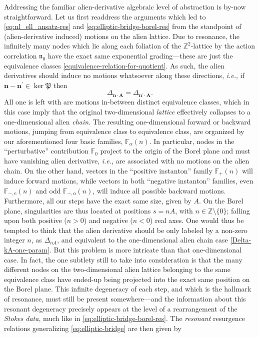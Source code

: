 \documentclass[11pt,a4paper]{article}
\def\BZ{{\mathbb Z}}
\def\BF{{\mathbb F}}
\newcommand{\nres}{\boldsymbol{\mathfrak{n}}_0}
\begin{document}
Addressing the familiar alien-derivative algebraic level of abstraction is by-now straightforward. Let us first readdress the arguments which led to \eqref{eq:nl_ell_ansatz-res} and \eqref{eq:elliptic-bridge-borel-res} from the standpoint of (alien-derivative induced) motions on the alien lattice. Due to resonance, the infinitely many nodes which lie along each foliation of the $\BZ^2$-lattice by the action correlation $\nres$ have the exact same exponential grading---these are just the equivalence classes \eqref{equivalence-relation-for-quotient}. As such, the alien derivatives should induce no motions whatsoever along these directions, \textit{i.e.}, if $\boldsymbol{n} - \boldsymbol{n}^\prime \in \ker \mathfrak{P}$ then
%
\begin{equation}
\Delta_{\boldsymbol{n} \cdot \boldsymbol{A}} = \Delta_{\boldsymbol{n}^\prime \cdot \boldsymbol{A}}.
\end{equation} 
%
\noindent
All one is left with are motions in-between distinct equivalence classes, which in this case imply that the original two-dimensional \textit{lattice} effectively collapses to a one-dimensional alien \textit{chain}. The resulting one-dimensional forward or backward motions, jumping from equivalence class to equivalence class, are organized by our aforementioned four basic families, $\BF_\alpha (n)$. In particular, nodes in the ``perturbative'' contribution $\BF_0$ project to the origin of the Borel plane and must have vanishing alien derivative, \textit{i.e.}, are associated with no motions on the alien chain. On the other hand, vectors in the ``positive instanton'' family $\BF_{+} (n)$ will induce forward motions, while vectors in both ``negative instanton'' families, even $\BF_{-,\text{e}} (n)$ and odd $\BF_{-,\text{o}} (n)$, will induce all possible backward motions. Furthermore, all our steps have the exact same size, given by $A$. On the Borel plane, singularities are thus located at positions $s = n A$, with $n \in \BZ \setminus \{ 0 \}$; falling upon both positive ($n>0$) and negative ($n<0$) real axes. One would thus be tempted to think that the alien derivative should be only labeled by a non-zero integer $n$, as $\Delta_{n A}$, and equivalent to the one-dimensional alien chain case \eqref{Delta-kA-one-param}. But this problem is more intricate than that one-dimensional case. In fact, the one subtlety still to take into consideration is that the many different nodes on the two-dimensional alien lattice belonging to the same equivalence class have ended-up being projected into the exact same position on the Borel plane. This infinite degeneracy of each step, and which is the hallmark of resonance, must still be present somewhere---and the information about this resonant degeneracy precisely appears at the level of a rearrangement of the \textit{Stokes data}, much like in \eqref{eq:elliptic-bridge-borel-res}. The \textit{resonant} resurgence relations generalizing \eqref{eq:elliptic-bridge} are then given by
\end{document}
